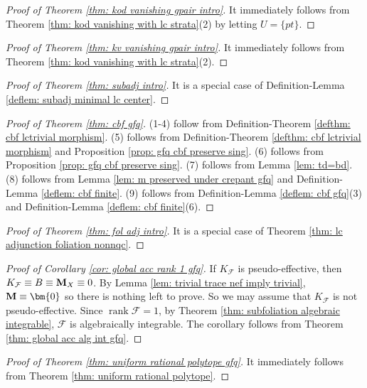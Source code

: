\documentclass[11pt]{amsart}
\numberwithin{equation}{section}
\newcommand{\Mm}{{\bf{M}}}
\newcommand{\rk}{\operatorname{rank}}
\newcommand{\Ff}{\mathcal{F}}
\theoremstyle{definition}
\theoremstyle{definition}
\theoremstyle{definition}
\begin{document}
\begin{proof}[Proof of Theorem \ref{thm: kod vanishing gpair intro}]
It immediately follows from Theorem \ref{thm: kod vanishing with lc strata}(2) by letting $U=\{pt\}$.
\end{proof}

\begin{proof}[Proof of Theorem \ref{thm: kv vanishing gpair intro}]
It immediately follows from Theorem \ref{thm: kod vanishing with lc strata}(2).
\end{proof}


\begin{proof}[Proof of Theorem \ref{thm: subadj intro}] It is a special case of Definition-Lemma \ref{deflem: subadj minimal lc center}.
\end{proof}




\begin{proof}[Proof of Theorem \ref{thm: cbf gfq}]
(1-4) follow from Definition-Theorem \ref{defthm: cbf lctrivial morphism}. (5) follows from Definition-Theorem \ref{defthm: cbf lctrivial morphism} and Proposition \ref{prop: gfq cbf preserve sing}. (6) follows from Proposition \ref{prop: gfq cbf preserve sing}. (7) follows from Lemma \ref{lem: td=bd}. (8) follows from Lemma \ref{lem: m preserved under crepant gfq} and Definition-Lemma \ref{deflem: cbf finite}. (9) follows from Definition-Lemma \ref{deflem: cbf gfq}(3) and Definition-Lemma \ref{deflem: cbf finite}(6).
\end{proof}

\begin{proof}[Proof of Theorem \ref{thm: fol adj intro}]
It is a special case of Theorem \ref{thm: lc adjunction foliation nonnqc}.
\end{proof}

\begin{proof}[Proof of Corollary \ref{cor: global acc rank 1 gfq}]  
If $K_{\Ff}$ is pseudo-effective, then $K_{\Ff}\equiv B\equiv\Mm_X\equiv 0$. By Lemma \ref{lem: trivial trace nef imply trivial}, $\Mm\equiv\bm{0}$ so there is nothing left to prove. So we may assume that $K_{\Ff}$ is not pseudo-effective. Since $\rk\Ff=1$, by Theorem \ref{thm: subfoliation algebraic integrable}, $\Ff$ is algebraically integrable. The corollary follows from Theorem \ref{thm: global acc alg int gfq}.
\end{proof}


\begin{proof}[Proof of Theorem \ref{thm: uniform rational polytope gfq}]
It immediately follows from Theorem \ref{thm: uniform rational polytope}.
\end{proof}
\end{document}
